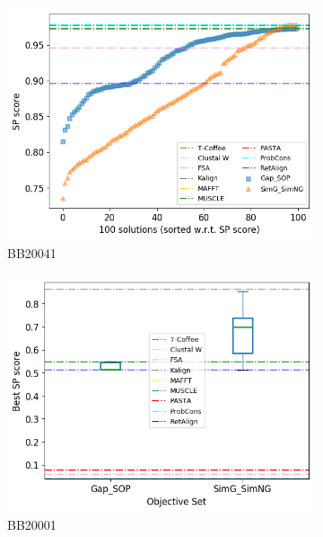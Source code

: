 \begin{figure}[!htbp]
\begin{adjustwidth}{-1cm}{-1cm}
\begin{subfigure}{0.22\textwidth}
			\includegraphics[width=\columnwidth]{Figure/summary/precomputedInit/Balibase/BB20041_pairs_density_single_run_2}
			\caption{BB20041}
		\end{subfigure}
		\begin{subfigure}{0.22\textwidth}
			\includegraphics[width=\columnwidth]{Figure/summary/precomputedInit/Balibase/BB20001_objset_pairs_rank_2}
			\caption{BB20001}
		\end{subfigure}	
		\begin{subfigure}{0.22\textwidth}

\end{subfigure}
\end{adjustwidth}
\end{figure}
